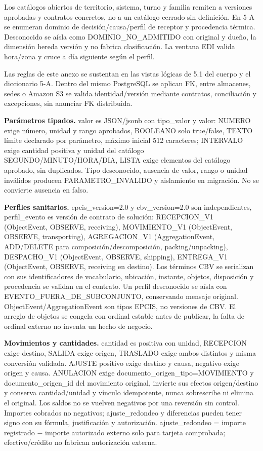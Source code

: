 Los catálogos abiertos de territorio, sistema, turno y familia remiten a versiones aprobadas y contratos concretos, no a un catálogo cerrado sin definición. En 5-A se enumeran dominio de decisión/causa/perfil de receptor y procedencia térmica. Desconocido se aísla como DOMINIO\_NO\_ADMITIDO con original y dueño, la dimensión hereda versión y no fabrica clasificación. La ventana EDI valida hora/zona y cruce a día siguiente según el perfil.

Las reglas de este anexo se sustentan en las vistas lógicas de 5.1 del cuerpo y el diccionario 5-A. Dentro del mismo PostgreSQL se aplican FK, entre almacenes, sedes o Amazon S3 se valida identidad/versión mediante contratos, conciliación y excepciones, sin anunciar FK distribuida.

\textbf{Parámetros tipados.} valor es JSON/jsonb con tipo\_valor y valor: NUMERO exige número, unidad y rango aprobados, BOOLEANO solo true/false, TEXTO límite declarado por parámetro, máximo inicial 512 caracteres; INTERVALO exige cantidad positiva y unidad del catálogo SEGUNDO/MINUTO/HORA/DIA, LISTA exige elementos del catálogo aprobado, sin duplicados. Tipo desconocido, ausencia de valor, rango o unidad inválidos producen PARAMETRO\_INVALIDO y aislamiento en migración. No se convierte ausencia en falso.

\textbf{Perfiles sanitarios.} epcis\_version=2.0 y cbv\_version=2.0 son independientes, perfil\_evento es versión de contrato de solución: RECEPCION\_V1 (ObjectEvent, OBSERVE, receiving), MOVIMIENTO\_V1 (ObjectEvent, OBSERVE, transporting), AGREGACION\_V1 (AggregationEvent, ADD/DELETE para composición/descomposición, packing/unpacking), DESPACHO\_V1 (ObjectEvent, OBSERVE, shipping), ENTREGA\_V1 (ObjectEvent, OBSERVE, receiving en destino). Los términos CBV se serializan con sus identificadores de vocabulario, ubicación, instante, objetos, disposición y procedencia se validan en el contrato. Un perfil desconocido se aísla con EVENTO\_FUERA\_DE\_SUBCONJUNTO, conservando mensaje original. ObjectEvent/AggregationEvent son tipos EPCIS, no versiones de CBV. El arreglo de objetos se congela con ordinal estable antes de publicar, la falta de ordinal externo no inventa un hecho de negocio.

\textbf{Movimientos y cantidades.} cantidad es positiva con unidad, RECEPCION exige destino, SALIDA exige origen, TRASLADO exige ambos distintos y misma conversión validada. AJUSTE positivo exige destino y causa, negativo exige origen y causa. ANULACION exige documento\_origen\_tipo=MOVIMIENTO y documento\_origen\_id del movimiento original, invierte sus efectos origen/destino y conserva cantidad/unidad y vínculo idempotente, nunca sobrescribe ni elimina el original. Los saldos no se vuelven negativos por una reversión sin control. Importes cobrados no negativos; ajuste\_redondeo y diferencias pueden tener signo con su fórmula, justificación y autorización. ajuste\_redondeo = importe registrado \ensuremath{-} importe autorizado externo solo para tarjeta comprobada; efectivo/crédito no fabrican autorización externa.

